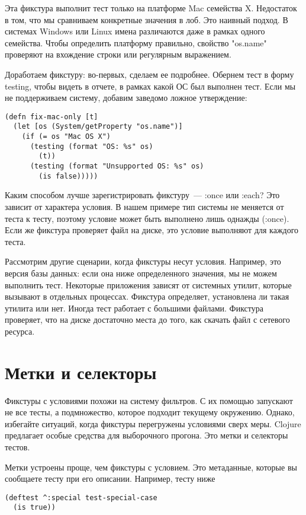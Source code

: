 Эта фикстура выполнит тест только на платформе Mac семейства X. Недостаток в
том, что мы сравниваем конкретные значения в лоб. Это наивный подход. В системах
Windows или Linux имена различаются даже в рамках одного семейства. Чтобы
определить платформу правильно, свойство "os.name" проверяют на вхождение строки
или регулярным выражением.

Доработаем фикстуру: во-первых, сделаем ее подробнее. Обернем тест в форму
testing, чтобы видеть в отчете, в рамках какой ОС был выполнен тест. Если мы не
поддерживаем систему, добавим заведомо ложное утверждение:

\begin{verbatim}
(defn fix-mac-only [t]
  (let [os (System/getProperty "os.name")]
    (if (= os "Mac OS X")
      (testing (format "OS: %s" os)
        (t))
      (testing (format "Unsupported OS: %s" os)
        (is false)))))
\end{verbatim}

Каким способом лучше зарегистрировать фикстуру~--- :once или :each? Это зависит от
характера условия. В нашем примере тип системы не меняется от теста к тесту,
поэтому условие может быть выполнено лишь однажды (:once). Если же фикстура
проверяет файл на диске, это условие выполняют для каждого теста.

Рассмотрим другие сценарии, когда фикстуры несут условия. Например, это версия
базы данных: если она ниже определенного значения, мы не можем выполнить
тест. Некоторые приложения зависят от системных утилит, которые вызывают в
отдельных процессах. Фикстура определяет, установлена ли такая утилита или
нет. Иногда тест работает с большими файлами. Фикстура проверяет, что на диске
достаточно места до того, как скачать файл с сетевого ресурса.

\section{Метки и селекторы}

Фикстуры с условиями похожи на систему фильтров. С их помощью запускают не все
тесты, а подмножество, которое подходит текущему окружению. Однако, избегайте
ситуаций, когда фикстуры перегружены условиями сверх меры. Clojure предлагает
особые средства для выборочного прогона. Это метки и селекторы тестов.

Метки устроены проще, чем фикстуры с условием. Это метаданные, которые вы
сообщаете тесту при его описании. Например, тесту ниже

\begin{verbatim}
(deftest ^:special test-special-case
  (is true))
\end{verbatim}

